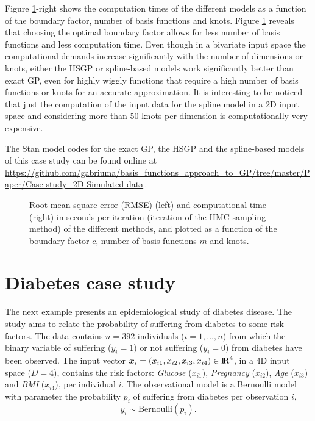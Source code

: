 \documentclass[onecolumn,a4paper,11pt]{article}
\begin{document}
Figure \ref{ch5_fig17_RMSE_exII}-right shows the computation times of the different models as a function of the boundary factor, number of basis functions and knots. Figure \ref{ch5_fig17_RMSE_exII} reveals that choosing the optimal boundary factor allows for less number of basis functions and less computation time. Even though in a bivariate input space the computational demands increase significantly with the number of dimensions or knots, either the HSGP or spline-based models work significantly better than exact GP, even for highly wiggly functions that require a high number of basis functions or knots for an accurate approximation. It is interesting to be noticed that just the computation of the input data for the spline model in a 2D input space and considering more than 50 knots per dimension is computationally very expensive.

The Stan model codes for the exact GP, the HSGP and the spline-based models of this case study can be found online at {\small \url{https://github.com/gabriuma/basis_functions_approach_to_GP/tree/master/Paper/Case-study_2D-Simulated-data}}\,.


\begin{figure}
\centering
{}
\caption{Root mean square error (RMSE) (left) and computational time (right) in seconds per iteration (iteration of the HMC sampling method) of the different methods, and plotted as a function of the boundary factor $c$, number of basis functions $m$ and knots.}
  \label{ch5_fig17_RMSE_exII}
\end{figure}


\section{Diabetes case study}\label{ch5_sec_bf_caseV}
The next example presents an epidemiological study of diabetes disease. The study aims to relate the probability of suffering from diabetes to some risk factors. The data contains $n=392$ individuals ($i=1,\dots,n$) from which the binary variable of suffering ($y_i=1$) or not suffering ($y_i=0$) from diabetes have been observed. The input vector $\bm{x}_i=(x_{i1},x_{i2},x_{i3},x_{i4}) \in {\rm I\!R}^{4}$, in a 4D input space ($D=4$), contains the risk factors: \textit{Glucose} ($x_{i1}$), \textit{Pregnancy} ($x_{i2}$), \textit{Age} ($x_{i3}$) and \textit{BMI} ($x_{i4}$), per individual $i$. The observational model is a Bernoulli model with parameter the probability $p_i$ of suffering from diabetes per observation $i$,
%
\begin{equation*}
y_i \sim \mathrm{Bernoulli}(p_i).
\end{equation*}
\end{document}
